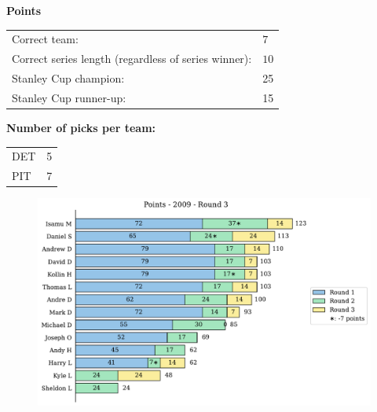 \documentclass[10pt]{article}
\begin{document}
{\bf Points}\\
\begin{minipage}{12cm}
    \begin{tabular}{l l}
        Correct team:	& $7$\\
        Correct series length (regardless of series winner):	& $10$\\
        Stanley Cup champion:	& 25\\
        Stanley Cup runner-up:	& 15\\
    \end{tabular}

    \vspace{1cm}
    {\bf Number of picks per team:}\\
    \begin{tabular}{lc }
        DET & 5 \\
        PIT & 7 \\
    \end{tabular}
\end{minipage}
\begin{minipage}[t]{13cm}
    \begin{figure}[H]
        \vspace{-3cm}
        \includegraphics[width=13cm]{../../figures/2009/Points-2009-Round3.pdf}
    \end{figure}
\end{minipage}
\end{document}
